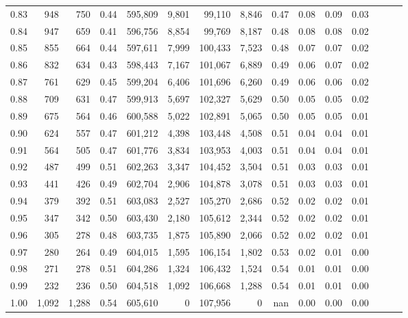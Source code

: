 \begin{tabular}{rrrrrrrrrrrrrrr}
0.83 &     948 &    750 &  0.44 &  595,809 &    9,801 &   99,110 &    8,846 &  0.47 &  0.08 &  0.09 &      0.03 \\
0.84 &     947 &    659 &  0.41 &  596,756 &    8,854 &   99,769 &    8,187 &  0.48 &  0.08 &  0.08 &      0.02 \\
0.85 &     855 &    664 &  0.44 &  597,611 &    7,999 &  100,433 &    7,523 &  0.48 &  0.07 &  0.07 &      0.02 \\
0.86 &     832 &    634 &  0.43 &  598,443 &    7,167 &  101,067 &    6,889 &  0.49 &  0.06 &  0.07 &      0.02 \\
0.87 &     761 &    629 &  0.45 &  599,204 &    6,406 &  101,696 &    6,260 &  0.49 &  0.06 &  0.06 &      0.02 \\
0.88 &     709 &    631 &  0.47 &  599,913 &    5,697 &  102,327 &    5,629 &  0.50 &  0.05 &  0.05 &      0.02 \\
0.89 &     675 &    564 &  0.46 &  600,588 &    5,022 &  102,891 &    5,065 &  0.50 &  0.05 &  0.05 &      0.01 \\
0.90 &     624 &    557 &  0.47 &  601,212 &    4,398 &  103,448 &    4,508 &  0.51 &  0.04 &  0.04 &      0.01 \\
0.91 &     564 &    505 &  0.47 &  601,776 &    3,834 &  103,953 &    4,003 &  0.51 &  0.04 &  0.04 &      0.01 \\
0.92 &     487 &    499 &  0.51 &  602,263 &    3,347 &  104,452 &    3,504 &  0.51 &  0.03 &  0.03 &      0.01 \\
0.93 &     441 &    426 &  0.49 &  602,704 &    2,906 &  104,878 &    3,078 &  0.51 &  0.03 &  0.03 &      0.01 \\
0.94 &     379 &    392 &  0.51 &  603,083 &    2,527 &  105,270 &    2,686 &  0.52 &  0.02 &  0.02 &      0.01 \\
0.95 &     347 &    342 &  0.50 &  603,430 &    2,180 &  105,612 &    2,344 &  0.52 &  0.02 &  0.02 &      0.01 \\
0.96 &     305 &    278 &  0.48 &  603,735 &    1,875 &  105,890 &    2,066 &  0.52 &  0.02 &  0.02 &      0.01 \\
0.97 &     280 &    264 &  0.49 &  604,015 &    1,595 &  106,154 &    1,802 &  0.53 &  0.02 &  0.01 &      0.00 \\
0.98 &     271 &    278 &  0.51 &  604,286 &    1,324 &  106,432 &    1,524 &  0.54 &  0.01 &  0.01 &      0.00 \\
0.99 &     232 &    236 &  0.50 &  604,518 &    1,092 &  106,668 &    1,288 &  0.54 &  0.01 &  0.01 &      0.00 \\
1.00 &   1,092 &  1,288 &  0.54 &  605,610 &        0 &  107,956 &        0 &   nan &  0.00 &  0.00 &      0.00 \\
\bottomrule
\end{tabular}
